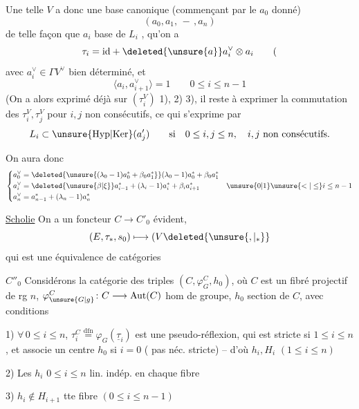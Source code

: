Une telle $V$ a donc une base canonique (commençant par le $a_0$ donné)
\[
(a_0,a_1,\,-\,,a_n)
\]
de telle façon que  $a_i$  base de $L_i$ ,  qu'on a
\[
\tau_i=\mathrm{id}+\deleted{\unsure{a}}a_i^\vee\otimes a_i\qquad (
\]
avec $a_i^\vee\in\Gamma V^\vee$ bien déterminé, et
\[
\langle a_i,a_{i+1}^\vee\rangle=1\qquad 0\leq i\leq n-1
\]
(On a alors exprimé déjà  sur $(\tau_i^V)$ 1), 2) 3), il  reste à exprimer  la commutation des $\tau_i^V,\tau_j^V$ pour $i,j$ non consécutifs, ce qui s'exprime par
\[
L_i\subset\unsure{\mathrm{Hyp}|\mathrm{Ker}}(a'_j)\qquad\text{si}\quad 0\leq i,j\leq n,\quad i,j\text{ non consécutifs.}
\]

On aura donc
\[
\left\{\begin{aligned}
 a_0^\vee&=\deleted{\unsure{(\lambda_0-1)a_0^*+\beta_0a_1^*}}(\lambda_0-1)a_0^*+\beta_0a_1^*\\
 a_i^\vee&=\deleted{\unsure{\beta|\xi}}a_{i-1}^*+(\lambda_i-1)a_i^*+\beta_i a_{i+1}^* & \unsure{0|1}\unsure{<|\leq}i\leq n-1\\
 a_n^\vee&=a_{n-1}^*+(\lambda_n-1)a_n^*
\end{aligned}\right.
\]

\uline{Scholie} On a un foncteur $C\longrightarrow C'_0$ évident,
\[
(E,\tau_*,s_0)\longmapsto(V\deleted{\unsure{,|_{*}}}
\]
qui est une équivalence de catégories

$\boxed{C''_0}$  Considérons la catégorie des   triples  $(C,\varphi_G^C,h_0)$, où $C$ est un fibré projectif de rg $n$, $\varphi_{\unsure{G|g}}^{C}\colon{C}\longrightarrow\mathrm{Aut}(C)$ hom de groupe, $h_0$ section de $C$, avec conditions

1) $\forall\,0\leq i\leq n$, $\tau_i^C\overset{\mathrm{dfn}}=\varphi_G(\underline{\tau}_i)$ est une pseudo-réflexion, qui est stricte si $1\leq i\leq n$, et associe un centre $h_0$ si $i=0$ ( pas néc. stricte) -- d'où $h_i,H_i$ $(1\leq i\leq n)$

2) Les $h_i$ $0\leq i\leq n$ lin. indép. en chaque fibre

3) $h_i\notin H_{i+1}$  tte fibre $(0\leq i\leq n-1)$

